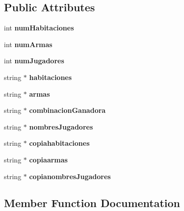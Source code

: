 \subsection*{Public Attributes}
\begin{DoxyCompactItemize}
\item 
\mbox{\label{class_cartas_a05eaec758fa05ff9beedf7b4a941e5e5}} 
int {\bfseries num\+Habitaciones}
\item 
\mbox{\label{class_cartas_a63037bda16092d2f60d4e599e1c004da}} 
int {\bfseries num\+Armas}
\item 
\mbox{\label{class_cartas_ac6382cda20bf230e57d13096aa9d8c15}} 
int {\bfseries num\+Jugadores}
\item 
\mbox{\label{class_cartas_ae1f6695611fa995ec088914c8b1c28dd}} 
string $\ast$ {\bfseries habitaciones}
\item 
\mbox{\label{class_cartas_af71c0f4a70823846c10f40655ddeb067}} 
string $\ast$ {\bfseries armas}
\item 
\mbox{\label{class_cartas_afa91fbaf91070eef3e7baa7dab882485}} 
string $\ast$ {\bfseries combinacion\+Ganadora}
\item 
\mbox{\label{class_cartas_aef2fbdeb00bee77ac884f9def1e212f8}} 
string $\ast$ {\bfseries nombres\+Jugadores}
\item 
\mbox{\label{class_cartas_a00017fd1cd703f5c7433003b4296345b}} 
string $\ast$ {\bfseries copiahabitaciones}
\item 
\mbox{\label{class_cartas_a16ac112d41f62a5f50eccc032afc58e6}} 
string $\ast$ {\bfseries copiaarmas}
\item 
\mbox{\label{class_cartas_a40baee6f6fd6a5fdaf4622eadce299fd}} 
string $\ast$ {\bfseries copianombres\+Jugadores}
\end{DoxyCompactItemize}


\subsection{Member Function Documentation}
\mbox{\label{class_cartas_a167c673371f5c944b845c5cf01990a59}} 
